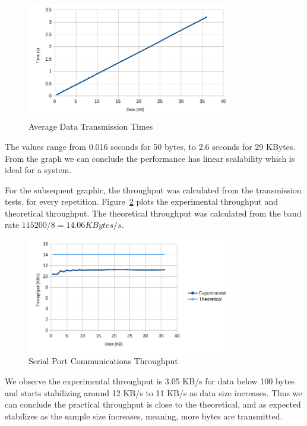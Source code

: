 \begin{figure}[h!]
	\centering
	\includegraphics[width=0.8\textwidth]{./Images/comms-time.png}
	\caption{Average Data Transmission Times}
	\label{fig:comms:time}
\end{figure}

The values range from 0.016 seconds for 50 bytes, to 2.6 seconds for 29 KBytes.
From the graph we can conclude the performance has linear scalability which is ideal for a system.

For the subsequent graphic, the throughput was calculated from the transmission tests, for every repetition.
Figure~\ref{fig:comms:tput} plots the experimental throughput and theoretical throughput. The theoretical throughput was calculated from the baud rate \(115200/8 = 14.06 KBytes/s\).
\begin{figure}[h!]
	\centering
	\includegraphics[width=0.8\textwidth]{./Images/comms-tput.png}
	\caption{Serial Port Communications Throughput}
	\label{fig:comms:tput}
\end{figure}

We observe the experimental throughput is 3.05 KB/s for data below 100 bytes and starts stabilizing around 12 KB/s to 11 KB/s as data size increases.
Thus we can conclude the practical throughput is close to the theoretical, and as expected stabilizes as the sample size increases, meaning, more bytes are transmitted.

